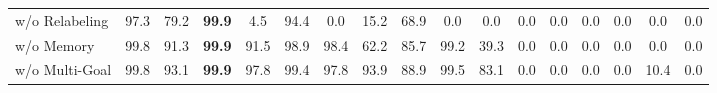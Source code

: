 \documentclass{article}
\begin{document}
\begin{table}[ht]
{\begin{tabular}{@{}lcccccccccccccccc@{}}
w/o Relabeling       & 97.3                                                    & 79.2                                                     & \textbf{99.9}                                          & 4.5                                                & 94.4                                                   & 0.0                                                   & 15.2                                               & 68.9                                                     & 0.0                                                     & 0.0                                                      & 0.0                                                      & 0.0                                                      & 0.0                                                    & 0.0                                                     & 0.0                                                        & 0.0                                                              \\
w/o Memory           & 99.8                                                    & 91.3                                                     & \textbf{99.9}                                          & 91.5                                               & 98.9                                                   & 98.4                                                  & 62.2                                               & 85.7                                                     & 99.2                                                    & 39.3                                                     & 0.0                                                      & 0.0                                                      & 0.0                                                    & 0.0                                                     & 0.0                                                        & 0.0                                                              \\
w/o Multi-Goal       & 99.8                                                    & 93.1                                                     & \textbf{99.9}                                          & 97.8                                               & 99.4                                                   & 97.8                                                  & 93.9                                               & 88.9                                                     & 99.5                                                    & 83.1                                                     & 0.0                                                      & 0.0                                                      & 0.0                                                    & 0.0                                                     & 10.4                                                       & 0.0                                                              \\

\end{tabular}}
\end{table}
\end{document}
